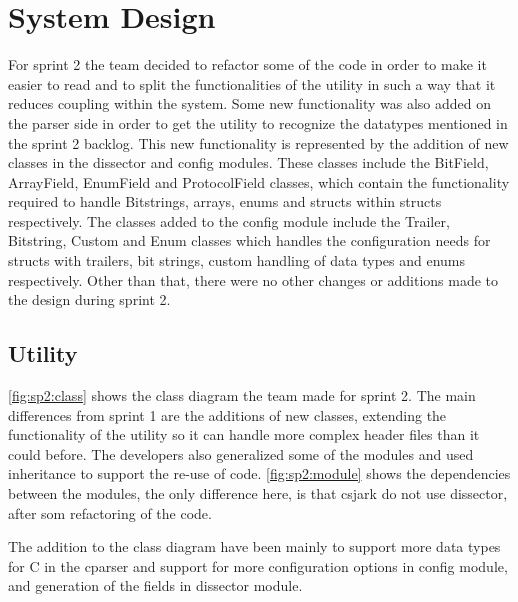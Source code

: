 \section{System Design}
\label{sec:sp2:design}
For sprint 2 the team decided to refactor some of the code in order to make it easier to read and to split the functionalities of the \gls{utility} in such a way that it reduces coupling within the system. Some new functionality was also added on the \gls{parser} side in order to get the \gls{utility} to recognize the datatypes mentioned in the sprint 2 backlog. This new functionality is represented by the addition of new classes in the \gls{dissector} and config modules. These classes include the BitField, ArrayField, EnumField and ProtocolField classes, which contain the functionality required to handle Bitstrings, \glspl{array}, \glspl{enum} and \glspl{struct} within \glspl{struct} respectively. The classes added to the config module include the Trailer, Bitstring, Custom and Enum classes which handles the configuration needs for \glspl{struct} with \gls{trailers}, \glspl{bit string}, custom handling of data types and \glspl{enum} respectively. Other than that, there were no other changes or additions made to the design during sprint 2.

\subsection{Utility}
\autoref{fig:sp2:class} shows the class diagram the team made for sprint 2. 
The main differences from sprint 1 are the additions of new classes, extending 
the functionality of the \gls{utility} so it can handle 
more complex \gls{header} files than it could before. The developers also 
generalized some of the modules and used inheritance to support the re-use of 
code. \autoref{fig:sp2:module} shows the dependencies between the modules,
the only difference here, is that csjark do not use dissector, after som refactoring
of the code.

The addition to the class diagram have been mainly to support more data types 
for C in the cparser and support for more configuration options in config 
module, and generation of the fields in dissector module.
 
